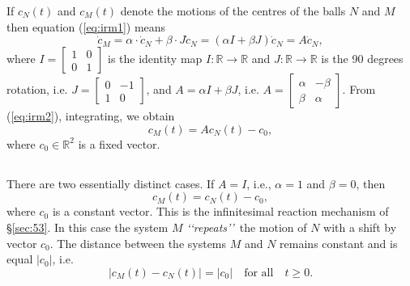 \documentclass[11pt]{amsart}
\def\R{\mathbb R}
\begin{document}
{If $c_N(t)$ and  $c_M(t)$ denote the motions of the centres of the balls $N$ and $M$ then equation (\ref{eq:irm1}) means
\begin{equation}\label{eq:irm2}
\dot c_M = \alpha\cdot \dot c_N + \beta\cdot J \dot c_N = (\alpha I+\beta J)\dot c_N =A \dot c_N,
\end{equation}
where $I=\left[\begin{array}{cc}
1 & 0\\
0 & 1
\end{array}\right]
$ is the identity map $I:\R\to \R$ and $J:\R\to \R$ is the 90 degrees rotation, i.e. $J=\left[
\begin{array}{cc}
0 & -1\\
1 & 0
\end{array}
\right]$, and $A=\alpha I+\beta J$, i.e. $A = \left[ \begin{array}{cc} \alpha& -\beta\\ \beta&\alpha\end{array}\right]$. 
From (\ref{eq:irm2}), integrating, we obtain 
\begin{equation}
c_M(t) = Ac_N(t) - c_0,
\end{equation}
where $c_0\in \R^2$ is a fixed vector. 



\subsection{} There are two essentially distinct cases.
If $A=I$, i.e., $\alpha =1$ and $\beta=0$, then $$c_M(t)=c_N(t)-c_0,$$ where $c_0$ is a constant vector. This is the infinitesimal reaction mechanism of 
\S \ref{sec:53}. In this case the system $M$ 
{\it \lq\lq repeats\rq\rq}\  
the motion of $N$ with a shift by vector $c_0$. The distance between the systems $M$ and $N$ remains constant and is equal $|c_0|$, i.e. 
$$|c_M(t)-c_N(t)|=|c_0| \quad \mbox{for all}\quad t\ge 0.$$
}
\end{document}
